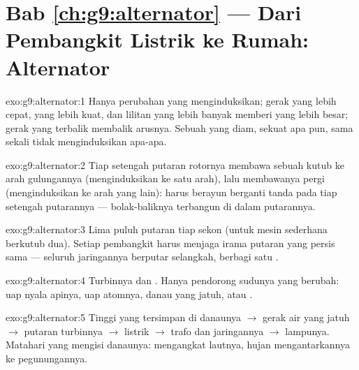 \section*{Bab \ref{ch:g9:alternator} --- Dari Pembangkit Listrik ke Rumah: Alternator}

\begin{solution}{exo:g9:alternator:1}
Hanya perubahan yang menginduksikan; gerak yang lebih cepat, 
yang lebih kuat, dan lilitan yang lebih banyak memberi  yang
lebih besar; gerak yang terbalik membalik arusnya. Sebuah  yang
diam, sekuat apa pun, sama sekali tidak menginduksikan apa-apa.
\end{solution}

\begin{solution}{exo:g9:alternator:2}
Tiap setengah putaran rotornya membawa sebuah kutub ke arah
gulungannya (menginduksikan ke satu arah), lalu membawanya pergi
(menginduksikan ke arah yang lain):  harus berayun berganti
tanda pada tiap setengah putarannya --- bolak-baliknya terbangun di
dalam putarannya.
\end{solution}

\begin{solution}{exo:g9:alternator:3}
Lima puluh putaran tiap sekon (untuk mesin sederhana berkutub dua).
Setiap pembangkit harus menjaga irama putaran yang persis sama ---
seluruh jaringannya berputar selangkah, berbagi satu .
\end{solution}

\begin{solution}{exo:g9:alternator:4}
Turbinnya dan . Hanya pendorong sudunya yang berubah: uap
nyala apinya, uap atomnya, danau yang jatuh, atau .
\end{solution}

\begin{solution}{exo:g9:alternator:5}
Tinggi yang tersimpan di danaunya $\to$ gerak air yang jatuh $\to$
putaran turbinnya $\to$ listrik  $\to$ trafo dan
jaringannya $\to$ lampunya. Matahari yang mengisi danaunya: 
mengangkat lautnya, hujan mengantarkannya ke pegunungannya.
\end{solution}

